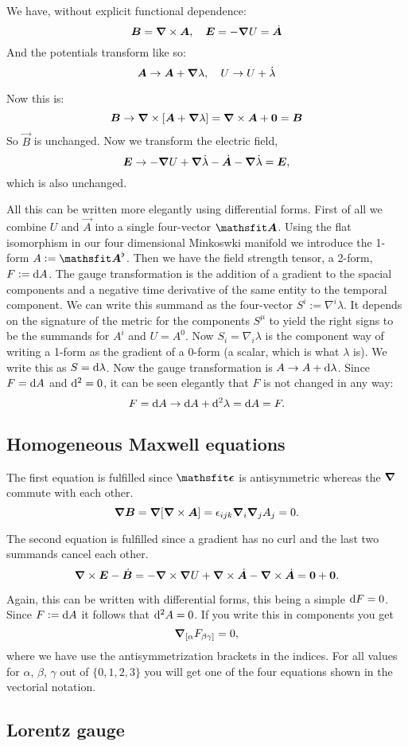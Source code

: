 \documentclass[11pt, ngerman, fleqn, DIV=15, headinclude, BCOR=1cm]{scrartcl}
\begin{document}
We have, without explicit functional dependence:
\[
    \boldsymbol{B} = \boldsymbol{\nabla} \times \boldsymbol{A}
    ,\quad
    \boldsymbol{E} = - \boldsymbol{\nabla} U = \dot{\boldsymbol{A}}
\]
And the potentials transform like so:
\[
    \boldsymbol{A} \to \boldsymbol{A} + \boldsymbol{\nabla} \lambda
    ,\quad
    U \to U + \dot \lambda
\]

Now this is:
\[
    \vec B \to \curl \sbr{\vec A + \vnabla \lambda} = \curl \vec A + \vec 0 =
    \vec B
\]
So $\vec B$ is unchanged. Now we transform the electric field,
\[
    \boldsymbol{E} \to - \boldsymbol{\nabla} U + \boldsymbol{\nabla} \dot \lambda - \dot{\boldsymbol{A}} - \boldsymbol{\nabla} \dot
    \lambda = \boldsymbol{E},
\]
which is also unchanged.

All this can be written more elegantly using differential forms. First of all
we combine $U$ and $\vec A$ into a single four-vector $\tens A$. Using the flat
isomorphism in our four dimensional Minkoswki manifold we introduce the 1-form
$A := \tens A^\flat$. Then we have the field strength tensor, a 2-form, $F :=
\dif A$. The gauge transformation is the addition of a gradient to the spacial
components and a negative time derivative of the same entity to the temporal
component. We can write this summand as the four-vector $S^i := \nabla^i
\lambda$. It depends on the signature of the metric for the components $S^\mu$
to yield the right signs to be the summands for $A^i$ and $U = A^0$. Now $S_i =
\nabla_i \lambda$ is the component way of writing a 1-form as the gradient of a
0-form (a scalar, which is what $\lambda$ is). We write this as $S = \dif
\lambda$. Now the gauge transformation is $A \to A + \dif \lambda$. Since $F =
\dif A$ and $\dif{^2} = 0$, it can be seen elegantly that $F$ is not changed in
any way:
\[
    F = \dif A \to \dif A + \dif{^2} \lambda = \dif A = F.
\]

\subsection{Homogeneous Maxwell equations}

The first equation is fulfilled since $\tens \epsilon$ is antisymmetric whereas
the $\boldsymbol{\nabla}$ commute with each other.
\[
    \boldsymbol{\nabla} \boldsymbol{B} = \boldsymbol{\nabla} [\boldsymbol{\nabla} \times \boldsymbol{A}] = \epsilon_{ijk} \boldsymbol{\nabla}_i
    \boldsymbol{\nabla}_j A_j = 0.
\]

The second equation is fulfilled since a gradient has no curl and the last two
summands cancel each other.
\[
    \boldsymbol{\nabla} \times \boldsymbol{E} - \dot{\boldsymbol{B}} = - \boldsymbol{\nabla} \times \boldsymbol{\nabla} U + \boldsymbol{\nabla} \times \dot{\boldsymbol{A}} - \boldsymbol{\nabla} \times
    \dot{\boldsymbol{A}} = \boldsymbol{0} + \boldsymbol{0}.
\]

Again, this can be written with differential forms, this being a simple $\dif F
= 0$. Since $F := \dif A$ it follows that $\dif{^2} A = 0$. If you write this
in components you get
\[
    \boldsymbol{\nabla}_{[\alpha} F_{\beta\gamma]} = 0,
\]
where we have use the antisymmetrization brackets in the indices. For all
values for $\alpha$, $\beta$, $\gamma$ out of $\{0, 1, 2, 3\}$ you will get one
of the four equations shown in the vectorial notation.

\subsection{Lorentz gauge}
\end{document}
